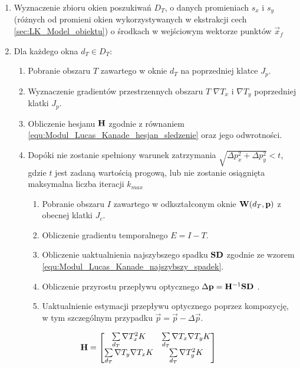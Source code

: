 \begin{enumerate}

	\item Wyznaczenie zbioru okien poszukiwań $D_T$, o danych promieniach $s_x$ i $s_y$ (różnych od promieni okien wykorzystywanych w ekstrakcji cech \ref{sec:LK_Model_obiektu}) o środkach w wejściowym wektorze punktów $\vec{x}_f$
	\item Dla każdego okna $d_T \in D_T$:
	
	\begin{enumerate}
	
		\item Pobranie obszaru $T$ zawartego w oknie $d_T$ na poprzedniej klatce $J_p$.
		\item Wyznaczenie gradientów przestrzennych obszaru $T$  $\nabla T_{x}$ i $\nabla T_{y}$ poprzedniej klatki $J_p$.
		\item Obliczenie hesjanu $\mathbf{H}$ zgodnie z równaniem \ref{equ:Modul_Lucas_Kanade_hesjan_sledzenie} oraz jego odwrotności.
		
		\item Dopóki nie zostanie spełniony warunek zatrzymania $\sqrt{\Delta p_x^2 + \Delta p_y^2} < t$, gdzie $t$ jest zadaną wartością progową, lub nie zostanie osiągnięta maksymalna liczba iteracji $k_{max}$
		
		\begin{enumerate}
		
				\item Pobranie obszaru $I$ zawartego w odkształconym oknie $\mathbf{W}(d_T, \mathbf{p})$ z obecnej klatki $J_c$.
				\item Obliczenie gradientu temporalnego $E = I - T$.
				\item Obliczenie uaktualnienia najszybszego spadku $\mathbf{SD}$ zgodnie ze wzorem \ref{equ:Modul_Lucas_Kanade_najszybszy_spadek}.
				\item Obliczenie przyrostu przepływu optycznego $\Delta \mathbf{p} = \mathbf{H}^{-1} \mathbf{SD}$ .
				\item Uaktualnienie estymacji przepływu optycznego poprzez kompozycję, w tym szczególnym przypadku $\vec{p} = \vec{p} - \Delta \vec{p}$.
		
		\end{enumerate}
	
	\end{enumerate}

\end{enumerate}  

\begin{equation}
\label{equ:Modul_Lucas_Kanade_hesjan_sledzenie}	
	\mathbf{H} = \begin{bmatrix}
		\sum\limits_{d_T} \nabla T_{x}^2 K & \sum\limits_{d_T} \nabla T_{x}  \nabla T_{y} K \\
		\sum\limits_{d_T} \nabla T_{y} \nabla T_{x} K & \sum\limits_{d_T} \nabla T_{y}^2 K
	\end{bmatrix}
\end{equation}

